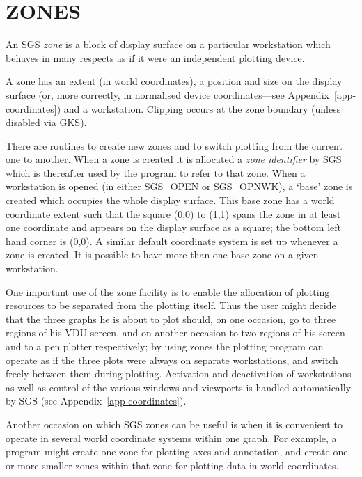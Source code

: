 \documentclass[11pt]{article}
\newcommand{\hyperref}[4]{#2\ref{#4}#3}
\newcommand{\htmlref}[2]{#1}
\begin{document}
\section {\label{zones}ZONES}

An SGS {\em zone}\/ is a block of display surface on a particular
workstation which behaves in many respects
as if it were an independent plotting device.

A zone has an extent (in world coordinates), a
position and size on the display surface (or, more correctly,
in normalised device coordinates---see 
\hyperref{this appendix}{Appendix~}{}{app-coordinates}) and a workstation.  
Clipping occurs at the zone boundary (unless disabled via GKS).

There are routines to create new
zones and to switch plotting from the
current one to another.  When
a zone is created it is allocated a {\em zone identifier}\/ by SGS
which is thereafter used by the program to refer to that
zone.  When a workstation is opened (in either 
\htmlref{SGS\_OPEN}{SGS_OPEN} or
\htmlref{SGS\_OPNWK}{SGS_OPNWK}), a `base' zone is created which occupies the
whole display surface.  This base zone has a world coordinate
extent such that the square (0,0) to (1,1) spans the
zone in
at least one
coordinate and appears on the display surface as
a square;  the bottom left hand corner is (0,0).  A similar 
default coordinate system is set
up whenever a zone is created.  It is possible
to have more than one base zone on a given workstation.

One important use of the zone
facility is to enable the allocation of plotting
resources to be separated from the plotting itself.  Thus
the user might decide that the three graphs he is about
to plot should, on one occasion, go to three regions of
his VDU screen, and on another occasion to two regions
of his screen and to a pen plotter respectively;  by using
zones the plotting program can operate as if the three
plots were always on separate workstations, and switch freely
between them during plotting.  Activation and deactivation
of workstations as well as
control of the various windows and viewports is handled automatically 
by SGS (see \hyperref{this appendix}{Appendix~}{}{app-coordinates}).

Another occasion on which SGS zones can be useful is when
it is convenient to operate in
several world coordinate systems within one graph.  For
example, a program might create one zone
for plotting axes and annotation, and create one or more smaller
zones within that zone for plotting data in world
coordinates.
\end{document}
